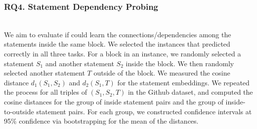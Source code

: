 \subsubsection{RQ4. Statement Dependency Probing}~\\
We aim to evaluate if {\tool} could learn the
connections/dependencies among the statements
inside the same  block. We selected the
instances that {\tool} predicted correctly in all three tasks. For
a  block in an instance, we randomly selected a
statement $S_1$ and another statement $S_2$ inside the block. We then
randomly selected another statement $T$ outside of the block. We
measured the cosine distance $d_1(S_1,S_2)$ and $d_2(S_1,T)$ for the
statement embeddings. We repeated the process for all triples of
$(S_1,S_2,T)$ in the Github dataset, and computed the cosine distances
for the group of inside statement pairs and the group of
inside-to-outside statement pairs. For each group, we constructed
confidence intervals at 95\% confidence via bootstrapping for the mean
of the distances.




 
